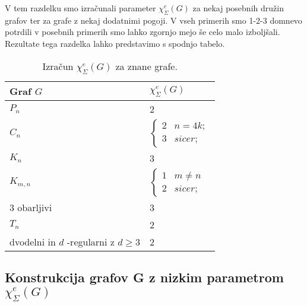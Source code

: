 \documentclass[12pt,a4paper,twoside]{article}
\theoremstyle{definition} %
\theoremstyle{plain} %
\newcommand{\ec}{\chi_{\Sigma}^e}
\numberwithin{equation}{section}  %
\begin{document}
V tem razdelku smo izračunali parameter $\ec(G)$ za nekaj posebnih družin grafov ter za grafe z nekaj dodatnimi pogoji. V vseh primerih smo 1-2-3 domnevo potrdili v posebnih primerih smo lahko zgornjo mejo še celo malo izboljšali. Rezultate tega razdelka lahko predstavimo s spodnjo tabelo.
\begin{table}[H]

\caption{\label{tab:tab1} Izračun $\ec(G)$ za znane grafe. }
\centering
\begin{tabular}{|l|l|}
\hline
 Graf $G$ & $\ec(G)$  \\ \hline
 $P_n$ & 2  \\ \hline
 $C_n$ & $\begin{cases}
	2 & n = 4k;\\ 
	3 & sicer;
	\end{cases}$  \\ \hline
 $K_n$& 3  \\ \hline
 $K_{m,n}$& $\begin{cases}
	1 & m \neq n\\ 
	2 & sicer;
	\end{cases}$  \\ \hline
 3 obarljivi& 3  \\ \hline
$T_n$ & 2  \\ \hline
dvodelni in $d$ -regularni z $d \ge 3 $ & 2  \\ \hline
\end{tabular}
\end{table}

\subsection{Konstrukcija grafov G z nizkim parametrom $\ec(G)$}
\end{document}
